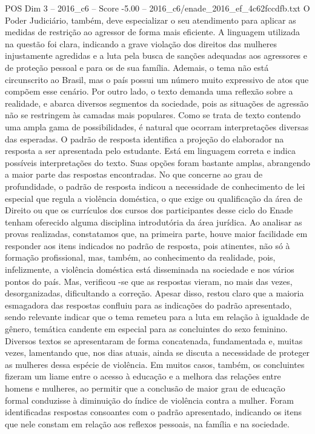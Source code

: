 \begin{textsample}{POS Dim 3 – 2016\_c6 – Score -5.00 – 2016\_c6/enade\_2016\_ef\_4c62fccdfb.txt}
O Poder Judiciário, também, deve especializar o seu atendimento para aplicar as medidas de restrição ao agressor de forma mais eficiente.
A linguagem utilizada na questão foi clara, indicando a grave violação dos direitos das mulheres injustamente agredidas e a luta pela busca de sanções adequadas aos agressores e de proteção pessoal e para os de sua família.
Ademais, o tema não está circunscrito ao Brasil, mas o país possui um número muito expressivo de atos que compõem esse cenário.
Por outro lado, o texto demanda uma reflexão sobre a realidade, e abarca diversos segmentos da sociedade, pois as situações de agressão não se restringem às camadas mais populares.
Como se trata de texto contendo uma ampla gama de possibilidades, é natural que ocorram interpretações diversas das esperadas.
O padrão de resposta identifica a projeção do elaborador na resposta a ser apresentada pelo estudante.
Está em linguagem correta e indica possíveis interpretações do texto.
Suas opções foram bastante amplas, abrangendo a maior parte das respostas encontradas.
No que concerne ao grau de profundidade, o padrão de resposta indicou a necessidade de conhecimento de lei especial que regula a violência doméstica, o que exige ou qualificação da área de Direito ou que os currículos dos cursos dos participantes desse ciclo do Enade tenham oferecido alguma disciplina introdutória da área jurídica.
Ao analisar as provas realizadas, constatamos que, na primeira parte, houve maior facilidade em responder aos itens indicados no padrão de resposta, pois atinentes, não só à formação profissional, mas, também, ao conhecimento da realidade, pois, infelizmente, a violência doméstica está disseminada na sociedade e nos vários pontos do país.
Mas, verificou -se que as respostas vieram, no mais das vezes, desorganizadas, dificultando a correção.
Apesar disso, restou claro que a maioria esmagadora das respostas confluiu para as indicações do padrão apresentado, sendo relevante indicar que o tema remeteu para a luta em relação à igualdade de gênero, temática candente em especial para as concluintes do sexo feminino.
Diversos textos se apresentaram de forma concatenada, fundamentada e, muitas vezes, lamentando que, nos dias atuais, ainda se discuta a necessidade de proteger as mulheres dessa espécie de violência.
Em muitos casos, também, os concluintes fizeram um liame entre o acesso à educação e a melhora das relações entre homens e mulheres, ao permitir que a conclusão de maior grau de educação formal conduzisse à diminuição do índice de violência contra a mulher.
Foram identificadas respostas consoantes com o padrão apresentado, indicando os itens que nele constam em relação aos reflexos pessoais, na família e na sociedade.

\end{textsample}
